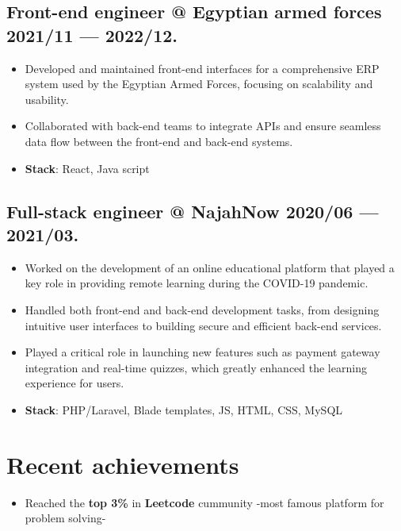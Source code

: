 \documentclass[a4,10pt]{article}
\newenvironment{zitemize}{
\begin{itemize}\itemsep0pt \parskip0pt \parsep1pt}
{\end{itemize}\vspace{-0.5cm}}
\begin{document}
\subsection*{Front-end engineer @ Egyptian armed forces \hfill 2021/11 --- 2022/12.} 
    \begin{zitemize}
        \item Developed and maintained front-end interfaces for a comprehensive ERP system used by the Egyptian Armed Forces, focusing on scalability and usability.
        \item Collaborated with back-end teams to integrate APIs and ensure seamless data flow between the front-end and back-end systems.
        \item \textbf{Stack}: React, Java script
    \end{zitemize}

\subsection*{Full-stack engineer @ NajahNow \hfill 2020/06 --- 2021/03.} 
    \begin{zitemize}
        \item Worked on the development of an online educational platform that played a key role in providing remote learning during the COVID-19 pandemic.
        \item Handled both front-end and back-end development tasks, from designing intuitive user interfaces to building secure and efficient back-end services.
        \item Played a critical role in launching new features such as payment gateway integration and real-time quizzes, which greatly enhanced the learning experience for users.
        \item \textbf{Stack}: PHP/Laravel, Blade templates, JS, HTML, CSS, MySQL
    \end{zitemize}

\section{Recent achievements} 
\renewcommand\refname{\vskip -1.5em}
\begin{zitemize}
    \item Reached the \textbf{top 3\%} in \textbf{Leetcode} cummunity -most famous platform for problem solving-
\end{zitemize}
\printbibliography[heading=none]
\vspace{0.2cm}
\end{document}
